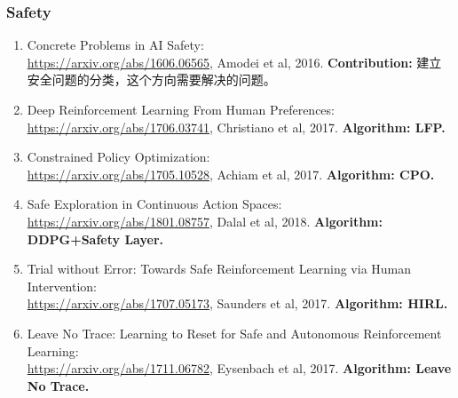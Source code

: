 \documentclass[lang=cn,11pt,a4paper]{elegant_template}
\begin{document}
\subsubsection{Safety}
\begin{enumerate}
    \item Concrete Problems in AI Safety:\\ \href{https://arxiv.org/abs/1606.06565}{https://arxiv.org/abs/1606.06565}, Amodei et al, 2016. \textbf{Contribution:} 建立安全问题的分类，这个方向需要解决的问题。
    \item Deep Reinforcement Learning From Human Preferences:\\ \href{https://arxiv.org/abs/1706.03741}{https://arxiv.org/abs/1706.03741}, Christiano et al, 2017. \textbf{Algorithm: LFP.}
    \item Constrained Policy Optimization:\\ \href{https://arxiv.org/abs/1705.10528}{https://arxiv.org/abs/1705.10528}, Achiam et al, 2017. \textbf{Algorithm: CPO.}
    \item Safe Exploration in Continuous Action Spaces:\\ \href{https://arxiv.org/abs/1801.08757}{https://arxiv.org/abs/1801.08757}, Dalal et al, 2018. \textbf{Algorithm: DDPG+Safety Layer.}
    \item Trial without Error: Towards Safe Reinforcement Learning via Human Intervention:\\ \href{https://arxiv.org/abs/1707.05173}{https://arxiv.org/abs/1707.05173}, Saunders et al, 2017. \textbf{Algorithm: HIRL.}
    \item Leave No Trace: Learning to Reset for Safe and Autonomous Reinforcement Learning:\\ \href{https://arxiv.org/abs/1711.06782}{https://arxiv.org/abs/1711.06782}, Eysenbach et al, 2017. \textbf{Algorithm: Leave No Trace.}
\end{enumerate}
\end{document}

